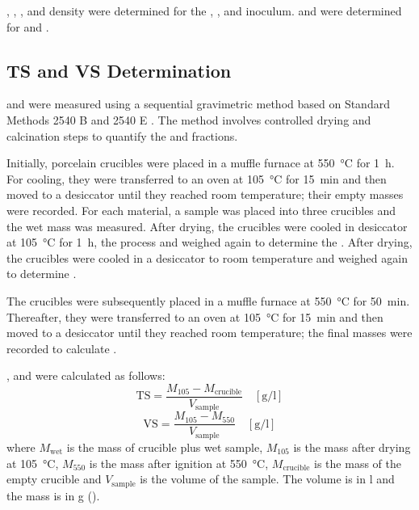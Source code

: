 , , , and density were determined for the , , and inoculum.  and  were determined for  and .

\subsection{TS and VS Determination}
\label{subsec:ts_vs_determination}

 and  were measured using a sequential gravimetric method based on Standard Methods 2540 B and 2540 E \parencite{apha2023}. The method involves controlled drying and calcination steps to quantify the  and  fractions.

Initially, porcelain crucibles were placed in a muffle furnace at \qty{550}{\celsius} for \qty{1}{\hour}. For cooling, they were transferred to an oven at \qty{105}{\celsius} for \qty{15}{\minute} and then moved to a desiccator until they reached room temperature; their empty masses were recorded. For each material, a sample was placed into three crucibles and the wet mass was measured. After drying, the crucibles were cooled in desiccator at \qty{105}{\celsius} for \qty{1}{\hour}, the process and weighed again to determine the . After drying, the crucibles were cooled in a desiccator to room temperature and weighed again to determine .

The crucibles were subsequently placed in a muffle furnace at \qty{550}{\celsius} for \qty{50}{\minute}. Thereafter, they were transferred to an oven at \qty{105}{\celsius} for \qty{15}{\minute} and then moved to a desiccator until they reached room temperature; the final masses were recorded to calculate .

, and  were calculated as follows:
\begin{equation}
    \mathrm{TS} = \frac{M_{105} - M_{\text{crucible}}}{V_{\text{sample}}} \quad \left[\unit{\gram\per\litre}\right]
    \label{eq:TS}
\end{equation}
\begin{equation}
    \mathrm{VS} = \frac{M_{105} - M_{550}}{V_{\text{sample}}} \quad \left[\unit{\gram\per\litre}\right]
    \label{eq:VS}
\end{equation}
where $M_{\text{wet}}$ is the mass of crucible plus wet sample, $M_{105}$ is the mass after drying at \qty{105}{\celsius}, $M_{550}$ is the mass after ignition at \qty{550}{\celsius}, $M_{\text{crucible}}$ is the mass of the empty crucible and $V_{\text{sample}}$ is the volume of the sample. The volume is in \unit{\litre} and the mass is in \unit{\gram} ().

